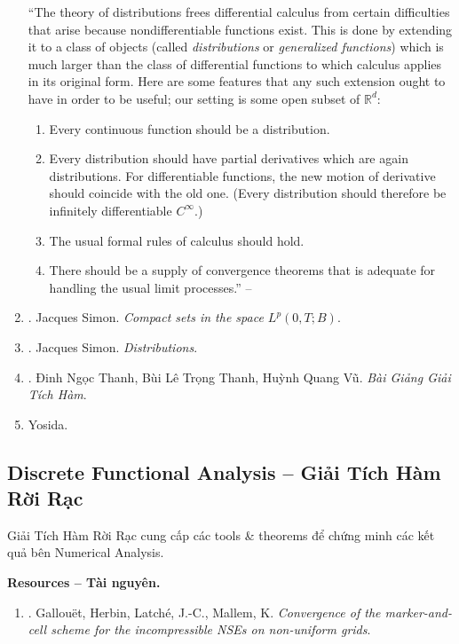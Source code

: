 \documentclass{article}
\begin{document}
\begin{enumerate}
	``The theory of distributions frees differential calculus from certain difficulties that arise because nondifferentiable functions exist. This is done by extending it to a class of objects (called {\it distributions} or {\it generalized functions}) which is much larger than the class of differential functions to which calculus applies in its original form. Here are some features that any such extension ought to have in order to be useful; our setting is some open subset of $\mathbb{R}^d$:
	\begin{enumerate}
		\item Every continuous function should be a distribution.
		\item Every distribution should have partial derivatives which are again distributions. For differentiable functions, the new motion of derivative should coincide with the old one. (Every distribution should therefore be infinitely differentiable $C^\infty$.)
		\item The usual formal rules of calculus should hold.
		\item There should be a supply of convergence theorems that is adequate for handling the usual limit processes.'' -- \cite[Chap. 6, pp. 149--150]{Rudin1991}
	\end{enumerate}
	\item \cite{Simon1987}. {\sc Jacques Simon}. {\it Compact sets in the space $L^p(0,T;B)$}.
	\item \cite{Simon2022}. {\sc Jacques Simon}. {\it Distributions}.
	\item \cite{Thanh_Thanh_Vu_gth}. {\sc Đinh Ngọc Thanh, Bùi Lê Trọng Thanh, Huỳnh Quang Vũ}. {\it Bài Giảng Giải Tích Hàm}.
	\item {\sc Yosida}.
\end{enumerate}

\subsection{Discrete Functional Analysis -- Giải Tích Hàm Rời Rạc}
Giải Tích Hàm Rời Rạc cung cấp các tools \& theorems để chứng minh các kết quả bên Numerical Analysis.

\noindent\textbf{\textsf{Resources -- Tài nguyên.}}
\begin{enumerate}
	\item \cite[Sect. 5: Appendix: Discrete Functional Analysis]{Gallouet_Herbin_Latche_Mallem2018}. {\sc Gallou\"{e}t, Herbin, Latch\'{e}, J.-C., Mallem, K.} {\it Convergence of the marker-and-cell scheme for the incompressible NSEs on non-uniform grids}.
\end{enumerate}
\end{document}
